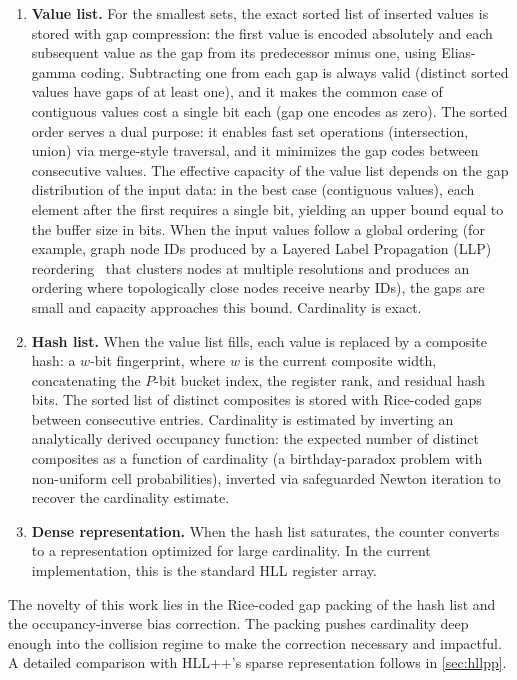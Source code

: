 \documentclass[11pt,letterpaper]{article}
\begin{document}
\begin{enumerate}
  \item \textbf{Value list.} For the smallest sets, the exact sorted
    list of inserted values is stored with gap compression: the first
    value is encoded absolutely and each subsequent value as the gap
    from its predecessor minus one, using Elias-gamma coding.
    Subtracting one from each gap is always valid (distinct sorted
    values have gaps of at least one), and it makes the common case
    of contiguous values cost a single bit each (gap one encodes as
    zero). The sorted order serves a dual purpose: it enables fast
    set operations (intersection, union) via merge-style traversal,
    and it minimizes the gap codes between consecutive values.
    The effective capacity of the value list depends on the gap
    distribution of the input data: in the best case (contiguous
    values), each element after the first requires a single bit,
    yielding an upper bound equal to the buffer size in bits.
    When the input values follow a global ordering (for example, graph node
    IDs produced by a Layered Label Propagation (LLP)
    reordering~\cite{boldi2010llp} that clusters nodes at multiple
    resolutions and produces an ordering where topologically close
    nodes receive nearby IDs), the gaps are small and capacity
    approaches this bound. Cardinality is exact.
  \item \textbf{Hash list.} When the value list fills, each value is
    replaced by a composite hash: a $w$-bit fingerprint, where $w$ is
    the current composite width, concatenating the $P$-bit bucket
    index, the register rank, and residual hash bits. The sorted list
    of distinct composites is stored with Rice-coded gaps between
    consecutive entries. Cardinality is estimated by inverting an
    analytically derived occupancy function: the expected number of
    distinct composites as a function of cardinality (a birthday-paradox
    problem with non-uniform cell probabilities), inverted via
    safeguarded Newton iteration to recover the cardinality estimate.
  \item \textbf{Dense representation.} When the hash list saturates,
    the counter converts to a representation optimized for large
    cardinality. In the current implementation, this is the standard
    HLL register array.
\end{enumerate}

The novelty of this work lies in the Rice-coded gap packing of the
hash list and the occupancy-inverse bias correction. The packing
pushes cardinality deep enough into the collision regime to make
the correction necessary and impactful. A detailed comparison with
HLL++'s sparse representation follows in \autoref{sec:hllpp}.
\end{document}

